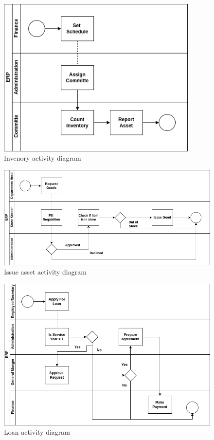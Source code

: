 \begin{figure}[!h]
\label{login_activity_diagram}
\center
\includegraphics[width=10cm,keepaspectratio]{activity_diagrams/manage_inventory_activity_diagram.drawio.png}
\caption{Invenory activity diagram}
\end{figure}


\begin{figure}[!h]
\label{asset_activity_diagram}
\center
\includegraphics[width=15cm,keepaspectratio]{activity_diagrams/manage_asset_activity_diagram.drawio.png}
\caption{Issue asset activity diagram}
\end{figure} 

\begin{figure}[!h]
\label{loan_activity_diagram}
\center
\includegraphics[width=15cm,keepaspectratio]{activity_diagrams/loan_activity_diagram.drawio.png}
\caption{Loan activity diagram}
\end{figure}

